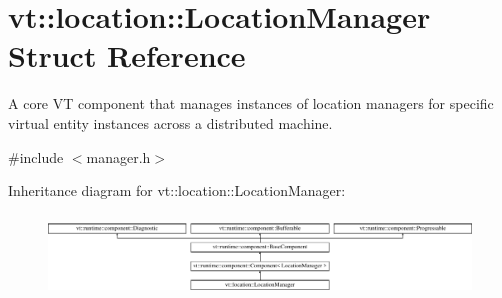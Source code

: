 \hypertarget{structvt_1_1location_1_1_location_manager}{}\section{vt\+:\+:location\+:\+:Location\+Manager Struct Reference}
\label{structvt_1_1location_1_1_location_manager}


A core VT component that manages instances of location managers for specific virtual entity instances across a distributed machine.  




{\ttfamily \#include $<$manager.\+h$>$}

Inheritance diagram for vt\+:\+:location\+:\+:Location\+Manager\+:\begin{figure}[H]
\begin{center}
\leavevmode
\includegraphics[height=2.222222cm]{structvt_1_1location_1_1_location_manager}
\end{center}
\end{figure}
